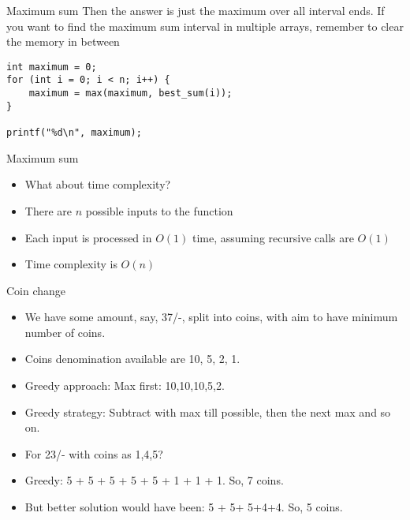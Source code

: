    \begin{frame}[fragile]{Maximum sum}
Then the answer is just the maximum over all interval ends.     If you want to find the maximum sum interval in multiple arrays, remember to clear the memory in between



    \begin{lstlisting}
int maximum = 0;
for (int i = 0; i < n; i++) {
    maximum = max(maximum, best_sum(i));
}

printf("%d\n", maximum);
    \end{lstlisting}
\end{frame}

   \begin{frame}[fragile]{Maximum sum}
    \begin{itemize}
        \item What about time complexity?
        \item There are $n$ possible inputs to the function
        \item Each input is processed in $O(1)$ time, assuming recursive calls are $O(1)$
        \item Time complexity is $O(n)$
    \end{itemize}
\end{frame}

   \begin{frame}[fragile]{Coin change}
    \begin{itemize}
\item We have some amount, say, 37/-, split into coins, with aim to have minimum number of coins. 
\item Coins denomination available are 10, 5, 2, 1.
\item Greedy approach: Max first: 10,10,10,5,2. 
\item Greedy strategy: Subtract with max till possible, then the next max and so on.
\item For 23/- with coins as 1,4,5?
\item Greedy: 5 + 5 + 5 + 5 + 5 + 1 + 1 + 1. So, 7 coins.
\item But better solution would have been: 5 + 5+ 5+4+4. So, 5 coins.
    \end{itemize}
\end{frame}



